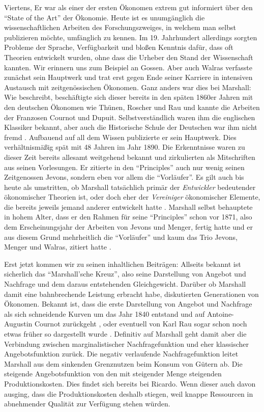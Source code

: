 Viertens, Er war als einer der ersten Ökonomen extrem gut informiert über den "`State of the Art"' der Ökonomie. Heute ist es unumgänglich die wissenschaftlichen Arbeiten des Forschungszweiges, in welchem man selbst publizieren möchte, umfänglich zu kennen. Im 19. Jahrhundert allerdings sorgten Probleme der Sprache, Verfügbarkeit und bloßen Kenntnis dafür, dass oft Theorien entwickelt wurden, ohne dass die Urheber den Stand der Wissenschaft kannten. Wir erinnern uns zum Beispiel an Gossen. Aber auch Walras verfasste zunächst sein Hauptwerk und trat erst gegen Ende seiner Karriere in intensiven Austausch mit zeitgenössischen Ökonomen. Ganz anders war dies bei Marshall: Wie \textcite{Groenewegen1995} beschreibt, beschäftigte sich dieser bereits in den späten 1860er Jahren mit den deutschen Ökonomen wie Thünen, Roscher und Rau und kannte die Arbeiten der Franzosen Cournot und Dupuit. Selbstverständlich waren ihm die englischen Klassiker bekannt, aber auch die Historische Schule der Deutschen war ihm nicht fremd \parencite[S. 140]{Rieter1989}. Aufbauend auf all dem Wissen publizierte er sein Hauptwerk. Dies verhältnismäßig spät mit 48 Jahren im Jahr 1890. Die Erkenntnisse waren zu dieser Zeit bereits allesamt weitgehend bekannt und zirkulierten als Mitschriften aus seinen Vorlesungen. Er zitierte in den "`Principles"' auch nur wenig seinen Zeitgenossen Jevons, sondern eben vor allem die "`Vorläufer"'. Es gilt auch bis heute als umstritten, ob Marshall tatsächlich primär der \textit{Entwickler} bedeutender ökonomischer Theorien ist, oder doch eher der \textit{Vereiniger} ökonomischer Elemente, die bereits jeweils jemand anderer entwickelt hatte \parencite[S. 207ff]{Ekelund2002}. Marshall selbst behauptete in hohem Alter, dass er den Rahmen für seine "`Principles"' schon vor 1871, also dem Erscheinungsjahr der Arbeiten von Jevons und Menger, fertig hatte und er aus diesem Grund mehrheitlich die "`Vorläufer"' und kaum das Trio Jevons, Menger und Walras, zitiert hatte \parencite[S. 140]{Rieter1989}. 

Erst jetzt kommen wir zu seinen inhaltlichen Beiträgen: Allseits bekannt ist sicherlich das "`Marshall'sche Kreuz"', also seine Darstellung von Angebot und Nachfrage und dem daraus entstehenden Gleichgewicht. Darüber ob Marshall damit eine bahnbrechende Leistung erbracht habe, diskutierten Generationen von Ökonomen. Bekannt ist, dass die erste Darstellung von Angebot und Nachfrage als sich schneidende Kurven um das Jahr 1840 entstand und auf Antoine-Augustin Cournot zurückgeht \parencite[S. 3]{Humphrey1992}, oder eventuell von Karl Rau sogar schon noch etwas früher so dargestellt wurde \parencite[S. 159]{Blaug2001}. Definitiv auf Marshall geht damit aber die Verbindung zwischen marginalistischer Nachfragefunktion und eher klassischer Angebotsfunktion zurück. Die negativ verlaufende Nachfragefunktion leitet Marshall aus dem sinkenden Grenznutzen beim Konsum von Gütern ab. Die steigende Angebotsfunktion von den mit steigender Menge steigenden Produktionskosten. Dies findet sich bereits bei Ricardo. Wenn dieser auch davon ausging, dass die Produktionskosten deshalb stiegen, weil knappe Ressourcen in abnehmender Qualität zur Verfügung stehen würden.

